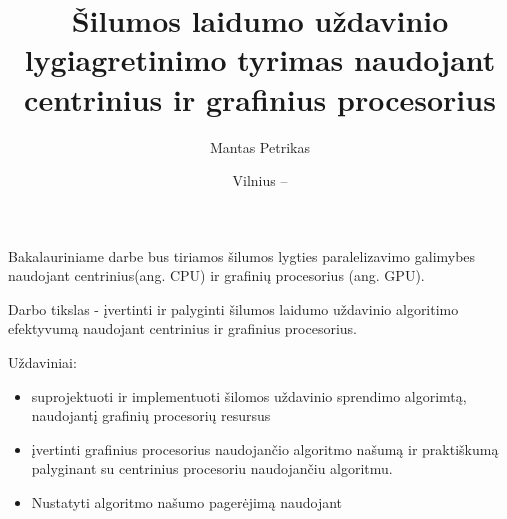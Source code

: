 \documentclass{VUMIFPSbakalaurinis}
\title{Šilumos laidumo uždavinio lygiagretinimo tyrimas naudojant centrinius ir grafinius procesorius}
\author{Mantas Petrikas}
\date{Vilnius – \the\year}
\begin{document}
\maketitle







Bakalauriniame darbe bus tiriamos šilumos lygties paralelizavimo galimybes naudojant centrinius(ang. CPU) ir grafinių procesorius (ang. GPU).


Darbo tikslas - įvertinti ir palyginti šilumos laidumo uždavinio algoritimo efektyvumą naudojant centrinius ir grafinius procesorius.

Uždaviniai:
\begin{itemize}
    \item suprojektuoti ir implementuoti šilomos uždavinio sprendimo algorimtą, naudojantį grafinių procesorių resursus
    \item įvertinti grafinius procesorius naudojančio algoritmo našumą ir praktiškumą palyginant su centrinius procesoriu naudojančiu algoritmu.
    \item Nustatyti algoritmo našumo pagerėjimą naudojant
\end{itemize}

\end{document}
